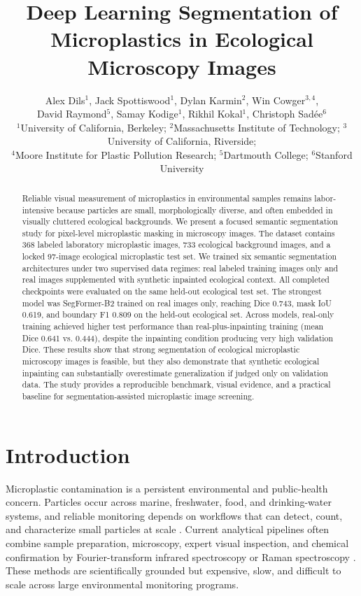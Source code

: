 \documentclass[11pt]{article}
\title{\vspace{-1.5em}Deep Learning Segmentation of Microplastics in Ecological Microscopy Images}
\author{\small
Alex Dils$^{1}$, Jack Spottiswood$^{1}$, Dylan Karmin$^{2}$, Win Cowger$^{3,4}$,\\
David Raymond$^{5}$, Samay Kodige$^{1}$, Rikhil Kokal$^{1}$, Christoph Sad\'ee$^{6}$\\[0.5em]
\footnotesize $^{1}$University of California, Berkeley;
$^{2}$Massachusetts Institute of Technology;
$^{3}$University of California, Riverside;\\
\footnotesize $^{4}$Moore Institute for Plastic Pollution Research;
$^{5}$Dartmouth College;
$^{6}$Stanford University
}
\date{}
\begin{document}
\maketitle

\begin{abstract}
Reliable visual measurement of microplastics in environmental samples remains labor-intensive because particles are small, morphologically diverse, and often embedded in visually cluttered ecological backgrounds. We present a focused semantic segmentation study for pixel-level microplastic masking in microscopy images. The dataset contains 368 labeled laboratory microplastic images, 733 ecological background images, and a locked 97-image ecological microplastic test set. We trained six semantic segmentation architectures under two supervised data regimes: real labeled training images only and real images supplemented with synthetic inpainted ecological context. All completed checkpoints were evaluated on the same held-out ecological test set. The strongest model was SegFormer-B2 trained on real images only, reaching Dice 0.743, mask IoU 0.619, and boundary F1 0.809 on the held-out ecological set. Across models, real-only training achieved higher test performance than real-plus-inpainting training (mean Dice 0.641 vs. 0.444), despite the inpainting condition producing very high validation Dice. These results show that strong segmentation of ecological microplastic microscopy images is feasible, but they also demonstrate that synthetic ecological inpainting can substantially overestimate generalization if judged only on validation data. The study provides a reproducible benchmark, visual evidence, and a practical baseline for segmentation-assisted microplastic image screening.
\end{abstract}

\section{Introduction}

Microplastic contamination is a persistent environmental and public-health concern. Particles occur across marine, freshwater, food, and drinking-water systems, and reliable monitoring depends on workflows that can detect, count, and characterize small particles at scale \cite{geyer2017,ziani2023}. Current analytical pipelines often combine sample preparation, microscopy, expert visual inspection, and chemical confirmation by Fourier-transform infrared spectroscopy or Raman spectroscopy \cite{hidalgo2012,stock2020,primpke2020}. These methods are scientifically grounded but expensive, slow, and difficult to scale across large environmental monitoring programs.
\end{document}
